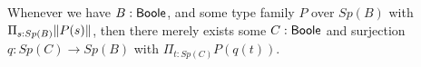 
\begin{axiom}\label{AxLocalChoice}
  Whenever we have $B:\mathsf{Boole}$, and some type family $P$ over $Sp(B)$ with 
  $\Pi_{s:Sp(B)} \lVert P(s) \rVert$, then there 
  merely exists some $C:\mathsf{Boole}$ and surjection $q:Sp(C)\to Sp(B)$ with 
$  \Pi_{t:Sp(C)} P(q(t))$.
\end{axiom}

